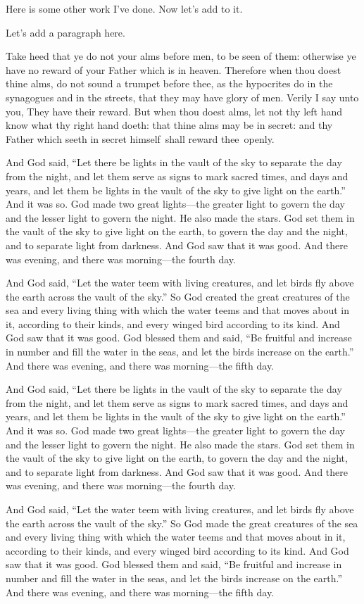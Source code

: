 \documentclass{grattanAlpha}
\begin{document}
Here is some other work I've done. Now let's add to it. 

Let's add a paragraph here. 

Take heed that ye do not your alms before men, to be seen of them: otherwise ye have no reward of your Father which is in heaven.
Therefore when thou doest thine alms, do not sound a trumpet before thee, as the hypocrites do in the synagogues and in the streets, that they may have glory of men.
Verily I say unto you, They have their reward.  
But when thou doest alms, let not thy left hand know what thy right hand doeth: that thine alms may be in secret: and thy Father which seeth in secret himself~shall reward thee~openly.

And God said, “Let there be lights in the vault of the sky to separate the day from the night, and let them serve as signs to mark sacred times, and days and years, and let them be lights in the vault of the sky to give light on the earth.”
And it was so.
God made two great lights—the greater light to govern the day and the lesser light to govern the night.
He also made the stars.
God set them in the vault of the sky to give light on the earth, to govern the day and the night, and to separate light from darkness.
And God saw that it was good.
And there was evening, and there was morning—the fourth day.

And God said, “Let the water teem with living creatures, and let birds fly above the earth across the vault of the sky.”
So God created the great creatures of the sea and every living thing with which the water teems and that moves about in it, according to their kinds, and every winged bird according to its kind.
And God saw that it was good.
God blessed them and said, “Be fruitful and increase in number and fill the water in the seas, and let the birds increase on the earth.”
And there was evening, and there was morning—the fifth day.

And God said, “Let there be lights in the vault of the sky to separate the day from the night, and let them serve as signs to mark sacred times, and days and years, and let them be lights in the vault of the sky to give light on the earth.”
And it was so.
God made two great lights—the greater light to govern the day and the lesser light to govern the night.
He also made the stars.
God set them in the vault of the sky to give light on the earth, to govern the day and the night, and to separate light from darkness.
And God saw that it was good.
And there was evening, and there was morning—the fourth day.

And God said, “Let the water teem with living creatures, and let birds fly above the earth across the vault of the sky.”
So God made the great creatures of the sea and every living thing with which the water teems and that moves about in it, according to their kinds, and every winged bird according to its kind.
And God saw that it was good.
God blessed them and said, “Be fruitful and increase in number and fill the water in the seas, and let the birds increase on the earth.”
And there was evening, and there was morning—the fifth day.
\end{document}
